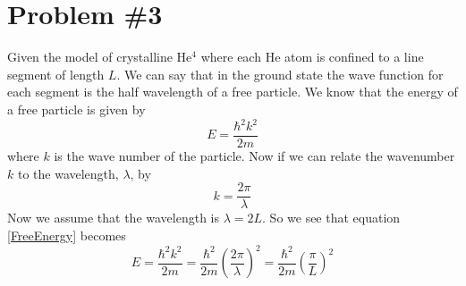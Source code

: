 \documentclass[11pt]{article}
\numberwithin{equation}{section}
\begin{document}
\section{Problem \#3}
Given the model of crystalline He$^4$ where each He atom is confined to a line segment of length $L$. We can say that in the ground state the wave function for each segment is the half wavelength of a free particle. We know that the energy of a free particle is given by
\begin{equation}
E = \frac{\hbar^2k^2}{2m}
\label{FreeEnergy}
\end{equation}
where $k$ is the wave number of the particle. Now if we can relate the wavenumber $k$ to the wavelength, $\lambda$, by
$$k = \frac{2\pi}{\lambda}$$
Now we assume that the wavelength is $\lambda = 2L$. So we see that equation \ref{FreeEnergy} becomes
$$E = \frac{\hbar^2k^2}{2m} = \frac{\hbar^2}{2m}\left(\frac{2\pi}{\lambda}\right)^2 = \frac{\hbar^2}{2m}\left(\frac{\pi}{L}\right)^2$$
\end{document}
